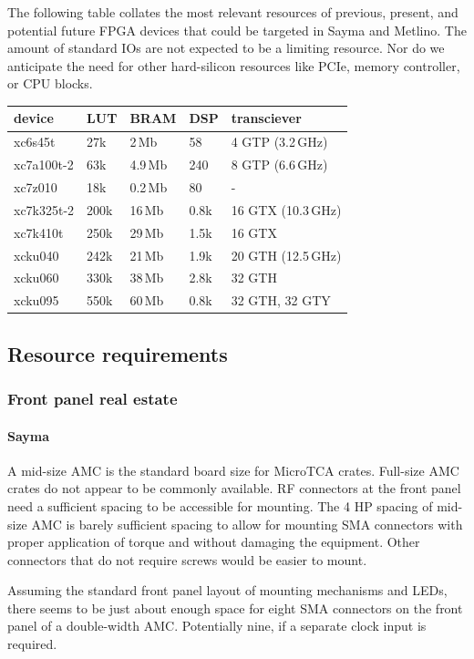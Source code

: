 \documentclass[11pt]{paper}
\begin{document}
The following table collates the most relevant resources of previous, present, and potential future FPGA devices that could be targeted in Sayma and Metlino.
The amount of standard IOs are not expected to be a limiting resource.
Nor do we anticipate the need for other hard-silicon resources like PCIe, memory controller, or CPU blocks.

\noindent
\begin{tabular}{l|llll}
   device   & LUT  & BRAM  & DSP  & transciever   \\\hline
   xc6s45t  & 27k  & 2\,Mb   & 58   & 4 GTP (3.2\,GHz)   \\
   xc7a100t-2 & 63k  & 4.9\,Mb & 240  & 8 GTP (6.6\,GHz)  \\
   xc7z010  & 18k  & 0.2\,Mb & 80   & -              \\
   xc7k325t-2 & 200k & 16\,Mb  & 0.8k & 16 GTX (10.3\,GHz) \\
   xc7k410t & 250k & 29\,Mb  & 1.5k & 16 GTX         \\
   xcku040  & 242k & 21\,Mb  & 1.9k & 20 GTH (12.5\,GHz) \\
   xcku060  & 330k & 38\,Mb  & 2.8k & 32 GTH         \\
   xcku095  & 550k & 60\,Mb  & 0.8k & 32 GTH, 32 GTY \\
\end{tabular}

\subsection{Resource requirements}

\subsubsection{Front panel real estate}

\paragraph{Sayma} A mid-size AMC is the standard board size for MicroTCA crates. Full-size AMC crates do not appear to be commonly available.
RF connectors at the front panel need a sufficient spacing to be accessible for mounting.
The 4 HP spacing of mid-size AMC is barely sufficient spacing to allow for mounting SMA connectors with proper application of torque and without damaging the equipment.
Other connectors that do not require screws would be easier to mount.

Assuming the standard front panel layout of mounting mechanisms and LEDs, there seems to be just about enough space for eight SMA connectors on the front panel of a double-width AMC.
Potentially nine, if a separate clock input is required.
\end{document}
